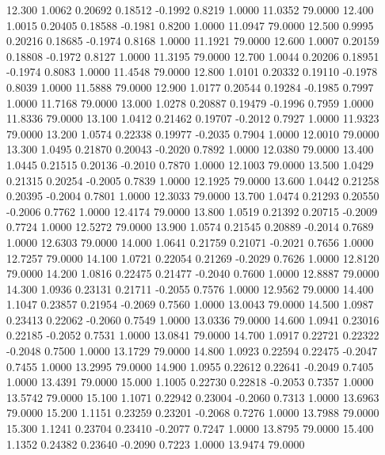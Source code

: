   12.300   1.0062   0.20692   0.18512  -0.1992   0.8219   1.0000  11.0352  79.0000
  12.400   1.0015   0.20405   0.18588  -0.1981   0.8200   1.0000  11.0947  79.0000
  12.500   0.9995   0.20216   0.18685  -0.1974   0.8168   1.0000  11.1921  79.0000
  12.600   1.0007   0.20159   0.18808  -0.1972   0.8127   1.0000  11.3195  79.0000
  12.700   1.0044   0.20206   0.18951  -0.1974   0.8083   1.0000  11.4548  79.0000
  12.800   1.0101   0.20332   0.19110  -0.1978   0.8039   1.0000  11.5888  79.0000
  12.900   1.0177   0.20544   0.19284  -0.1985   0.7997   1.0000  11.7168  79.0000
  13.000   1.0278   0.20887   0.19479  -0.1996   0.7959   1.0000  11.8336  79.0000
  13.100   1.0412   0.21462   0.19707  -0.2012   0.7927   1.0000  11.9323  79.0000
  13.200   1.0574   0.22338   0.19977  -0.2035   0.7904   1.0000  12.0010  79.0000
  13.300   1.0495   0.21870   0.20043  -0.2020   0.7892   1.0000  12.0380  79.0000
  13.400   1.0445   0.21515   0.20136  -0.2010   0.7870   1.0000  12.1003  79.0000
  13.500   1.0429   0.21315   0.20254  -0.2005   0.7839   1.0000  12.1925  79.0000
  13.600   1.0442   0.21258   0.20395  -0.2004   0.7801   1.0000  12.3033  79.0000
  13.700   1.0474   0.21293   0.20550  -0.2006   0.7762   1.0000  12.4174  79.0000
  13.800   1.0519   0.21392   0.20715  -0.2009   0.7724   1.0000  12.5272  79.0000
  13.900   1.0574   0.21545   0.20889  -0.2014   0.7689   1.0000  12.6303  79.0000
  14.000   1.0641   0.21759   0.21071  -0.2021   0.7656   1.0000  12.7257  79.0000
  14.100   1.0721   0.22054   0.21269  -0.2029   0.7626   1.0000  12.8120  79.0000
  14.200   1.0816   0.22475   0.21477  -0.2040   0.7600   1.0000  12.8887  79.0000
  14.300   1.0936   0.23131   0.21711  -0.2055   0.7576   1.0000  12.9562  79.0000
  14.400   1.1047   0.23857   0.21954  -0.2069   0.7560   1.0000  13.0043  79.0000
  14.500   1.0987   0.23413   0.22062  -0.2060   0.7549   1.0000  13.0336  79.0000
  14.600   1.0941   0.23016   0.22185  -0.2052   0.7531   1.0000  13.0841  79.0000
  14.700   1.0917   0.22721   0.22322  -0.2048   0.7500   1.0000  13.1729  79.0000
  14.800   1.0923   0.22594   0.22475  -0.2047   0.7455   1.0000  13.2995  79.0000
  14.900   1.0955   0.22612   0.22641  -0.2049   0.7405   1.0000  13.4391  79.0000
  15.000   1.1005   0.22730   0.22818  -0.2053   0.7357   1.0000  13.5742  79.0000
  15.100   1.1071   0.22942   0.23004  -0.2060   0.7313   1.0000  13.6963  79.0000
  15.200   1.1151   0.23259   0.23201  -0.2068   0.7276   1.0000  13.7988  79.0000
  15.300   1.1241   0.23704   0.23410  -0.2077   0.7247   1.0000  13.8795  79.0000
  15.400   1.1352   0.24382   0.23640  -0.2090   0.7223   1.0000  13.9474  79.0000
